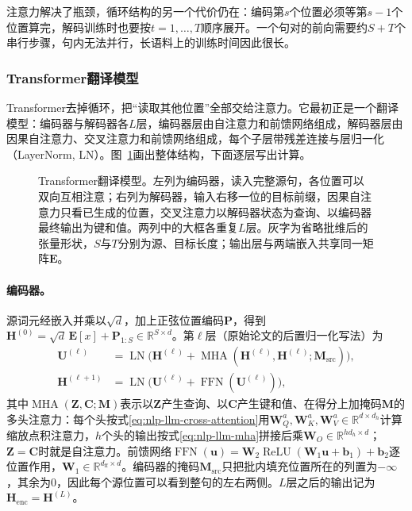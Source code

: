 注意力解决了瓶颈，循环结构的另一个代价仍在：编码第$s$个位置必须等第$s-1$个位置算完，解码训练时也要按$t=1,\ldots,T$顺序展开。一个句对的前向需要约$S+T$个串行步骤，句内无法并行，长语料上的训练时间因此很长。

\subsubsection{Transformer翻译模型}
\label{sec:nlp-generation-transformer-mt}

Transformer去掉循环，把“读取其他位置”全部交给注意力。它最初正是一个翻译模型：编码器与解码器各$L$层，编码器层由自注意力和前馈网络组成，解码器层由因果自注意力、交叉注意力和前馈网络组成，每个子层带残差连接与层归一化（LayerNorm, LN）。图~\ref{fig:nlp-generation-transformer-mt}画出整体结构，下面逐层写出计算。

\begin{figure}[htbp]
  \centering
  
  \caption{Transformer翻译模型。左列为编码器，读入完整源句，各位置可以双向互相注意；右列为解码器，输入右移一位的目标前缀，因果自注意力只看已生成的位置，交叉注意力以解码器状态为查询、以编码器最终输出为键和值。两列中的大框各重复$L$层。灰字为省略批维后的张量形状，$S$与$T$分别为源、目标长度；输出层与两端嵌入共享同一矩阵$\bm E$。}
  \label{fig:nlp-generation-transformer-mt}
\end{figure}

\paragraph{编码器。}源词元经嵌入并乘以$\sqrt d$，加上正弦位置编码$\bm P$，得到$\bm H^{(0)}=\sqrt d\,\bm E[x]+\bm P_{1:S}\in\mathbb R^{S\times d}$。第$\ell$层（原始论文的后置归一化写法）为
\begin{equation}
  \begin{aligned}
  \bm U^{(\ell)}&=\operatorname{LN}\bigl(\bm H^{(\ell)}+\operatorname{MHA}(\bm H^{(\ell)},\bm H^{(\ell)};\bm M_{\mathrm{src}})\bigr),\\
  \bm H^{(\ell+1)}&=\operatorname{LN}\bigl(\bm U^{(\ell)}+\operatorname{FFN}(\bm U^{(\ell)})\bigr),
  \end{aligned}
  \label{eq:nlp-generation-transformer-encoder}
\end{equation}
其中$\operatorname{MHA}(\bm Z,\bm C;\bm M)$表示以$\bm Z$产生查询、以$\bm C$产生键和值、在得分上加掩码$\bm M$的多头注意力：每个头按式\eqref{eq:nlp-llm-cross-attention}用$\bm W_Q^a,\bm W_K^a,\bm W_V^a\in\mathbb R^{d\times d_h}$计算缩放点积注意力，$h$个头的输出按式\eqref{eq:nlp-llm-mha}拼接后乘$\bm W_O\in\mathbb R^{hd_h\times d}$；$\bm Z=\bm C$时就是自注意力。前馈网络$\operatorname{FFN}(\bm u)=\bm W_2\operatorname{ReLU}(\bm W_1\bm u+\bm b_1)+\bm b_2$逐位置作用，$\bm W_1\in\mathbb R^{d_{\mathrm{ff}}\times d}$。编码器的掩码$\bm M_{\mathrm{src}}$只把批内填充位置所在的列置为$-\infty$，其余为0，因此每个源位置可以看到整句的左右两侧。$L$层之后的输出记为$\bm H_{\mathrm{enc}}=\bm H^{(L)}$。

